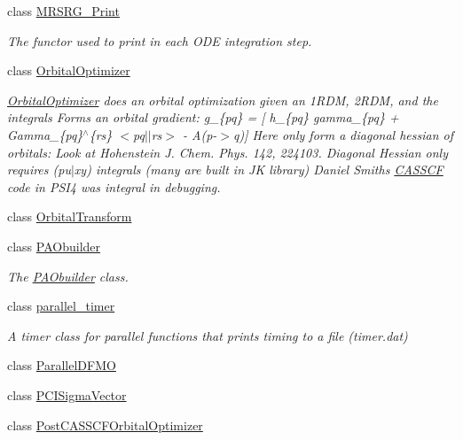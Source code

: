\begin{DoxyCompactItemize}
class \mbox{\hyperlink{classforte_1_1_m_r_s_r_g___print}{M\+R\+S\+R\+G\+\_\+\+Print}}
\begin{DoxyCompactList}\small\item\em The functor used to print in each O\+DE integration step. \end{DoxyCompactList}\item 
class \mbox{\hyperlink{classforte_1_1_orbital_optimizer}{Orbital\+Optimizer}}
\begin{DoxyCompactList}\small\item\em \mbox{\hyperlink{classforte_1_1_orbital_optimizer}{Orbital\+Optimizer}} does an orbital optimization given an 1\+R\+DM, 2\+R\+DM, and the integrals Forms an orbital gradient\+: g\+\_\+\{pq\} = \mbox{[} h\+\_\+\{pq\} gamma\+\_\+\{pq\} + Gamma\+\_\+\{pq\}$^\wedge$\{rs\} $<$pq$\vert$$\vert$rs$>$ -\/ A(p-\/$>$q)\mbox{]} Here only form a diagonal hessian of orbitals\+: Look at Hohenstein J. Chem. Phys. 142, 224103. Diagonal Hessian only requires (pu$\vert$xy) integrals (many are built in JK library) Daniel Smith\textquotesingle{}s \mbox{\hyperlink{classforte_1_1_c_a_s_s_c_f}{C\+A\+S\+S\+CF}} code in P\+S\+I4 was integral in debugging. \end{DoxyCompactList}\item 
class \mbox{\hyperlink{classforte_1_1_orbital_transform}{Orbital\+Transform}}
\item 
class \mbox{\hyperlink{classforte_1_1_p_a_obuilder}{P\+A\+Obuilder}}
\begin{DoxyCompactList}\small\item\em The \mbox{\hyperlink{classforte_1_1_p_a_obuilder}{P\+A\+Obuilder}} class. \end{DoxyCompactList}\item 
class \mbox{\hyperlink{classforte_1_1parallel__timer}{parallel\+\_\+timer}}
\begin{DoxyCompactList}\small\item\em A timer class for parallel functions that prints timing to a file (timer.\+dat) \end{DoxyCompactList}\item 
class \mbox{\hyperlink{classforte_1_1_parallel_d_f_m_o}{Parallel\+D\+F\+MO}}
\item 
class \mbox{\hyperlink{classforte_1_1_p_c_i_sigma_vector}{P\+C\+I\+Sigma\+Vector}}
\item 
class \mbox{\hyperlink{classforte_1_1_post_c_a_s_s_c_f_orbital_optimizer}{Post\+C\+A\+S\+S\+C\+F\+Orbital\+Optimizer}}
\item 

\end{DoxyCompactItemize}
